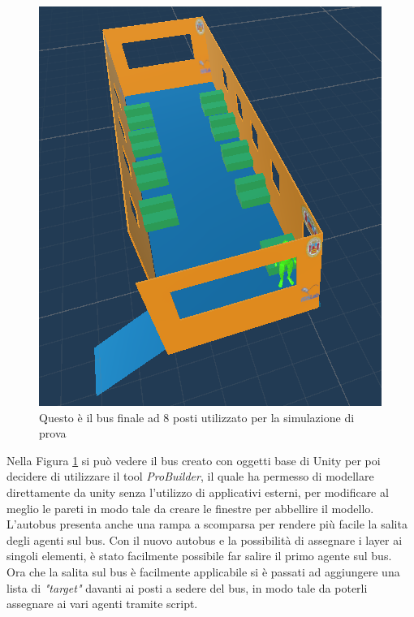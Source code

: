 \documentclass[12pt, openany]{book}
\begin{document}
	\begin{figure}[H]
		\centering
		\includegraphics[width=1\linewidth]{"Immagini/BasicBus.png"}
		\caption{Questo è il bus finale ad 8 posti utilizzato per la simulazione di prova}
		\label{fig:BasicBus}
	\end{figure}
	Nella Figura \ref{fig:BasicBus} si può vedere il bus creato con oggetti base di Unity per poi decidere di utilizzare il tool \emph{ProBuilder}, il quale ha permesso di modellare direttamente da unity senza l'utilizzo di applicativi esterni, per modificare al meglio le pareti in modo tale da creare le finestre per abbellire il modello. L'autobus presenta anche una rampa a scomparsa per rendere più facile la salita degli agenti sul bus.
	Con il nuovo autobus e la possibilità di assegnare i layer ai singoli elementi, è stato facilmente possibile far salire il primo agente sul bus.\\
	Ora che la salita sul bus è facilmente applicabile si è passati ad aggiungere una lista di \emph{"target"} davanti ai posti a sedere del bus, in modo tale da poterli assegnare ai vari agenti tramite script.
\end{document}
